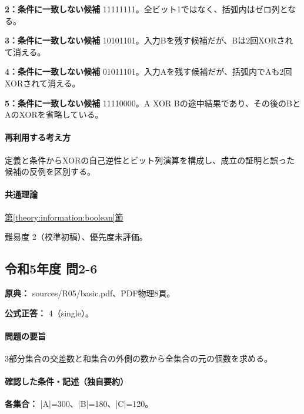\noindent\textbf{2：条件に一致しない候補} 11111111。全ビット1ではなく、括弧内はゼロ列となる。\par

\noindent\textbf{3：条件に一致しない候補} 10101101。入力Bを残す候補だが、Bは2回XORされて消える。\par

\noindent\textbf{4：条件に一致しない候補} 01011101。入力Aを残す候補だが、括弧内でAも2回XORされて消える。\par

\noindent\textbf{5：条件に一致しない候補} 11110000。A XOR Bの途中結果であり、その後のBとAのXORを省略している。\par

\paragraph{再利用する考え方} 定義と条件からXORの自己逆性とビット列演算を構成し、成立の証明と誤った候補の反例を区別する。

\paragraph{共通理論} \hyperref[theory:information:boolean]{第\ref*{theory:information:boolean}節}

\par 難易度 2（校準初稿）、優先度未評価。

\subsection{令和5年度 問2-6}
\label{q:r05-reg-basic-2-6}

\noindent\textbf{原典：} sources/R05/basic.pdf、PDF物理8頁。

\textbf{公式正答：} 4（single）。

\paragraph{問題の要旨} 3部分集合の交差数と和集合の外側の数から全集合の元の個数を求める。

\paragraph{確認した条件・記述（独自要約）}\mbox{}\par

\noindent\textbf{各集合：} |A|=300、|B|=180、|C|=120。\par

